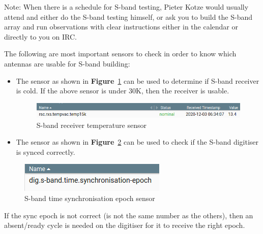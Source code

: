 Note: When there is a schedule for S-band testing, Pieter Kotze would usually attend and either do the S-band testing himself, or ask you to build the S-band array and run observations with clear instructions either in the calendar or directly to you on IRC.


The following are most important sensors to check in order to know which antennas are usable for S-band building:
\begin{itemize}
\item The  sensor as shown in \textbf{Figure}~\ref{fig:image48} can be used to determine if S-band receiver is cold.  If the above sensor is under 30\unit{K},  then the receiver is usable.
\begin{figure}[!thb]
	\centering
	\includegraphics[scale=0.5]{Chapters/images/image48.png}
	
	\caption{S-band receiver temperature sensor}
	\label{fig:image48}
\end{figure}
\item The  sensor as shown in \textbf{Figure}~\ref{fig:image85}  can be used to check if the S-band digitiser is synced correctly.
\end{itemize}


\begin{figure}[!thb]
	\centering
	\includegraphics[scale=0.7]{Chapters/images/image85.png}
	
	\caption{S-band time synchronisation epoch sensor}
	\label{fig:image85}
\end{figure}
If the sync epoch is not correct (is not the same number as the others), then an absent/ready cycle is needed on the digitiser for it to receive the right epoch.\\

